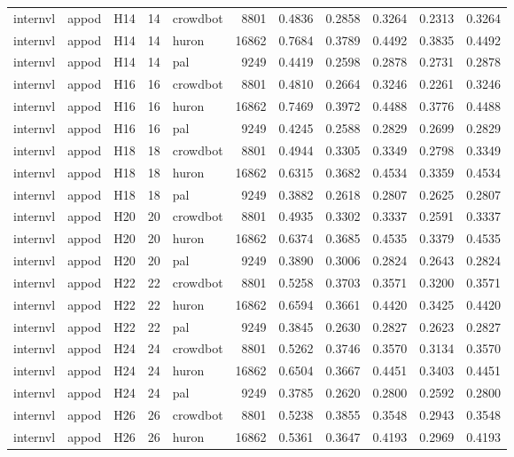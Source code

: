 \begin{table}[tbp]
\begin{tabular}{lllrlrrrrrr}
internvl & appod & H14 & 14 & crowdbot & 8801 & 0.4836 & 0.2858 & 0.3264 & 0.2313 & 0.3264 \\
internvl & appod & H14 & 14 & huron & 16862 & 0.7684 & 0.3789 & 0.4492 & 0.3835 & 0.4492 \\
internvl & appod & H14 & 14 & pal & 9249 & 0.4419 & 0.2598 & 0.2878 & 0.2731 & 0.2878 \\
internvl & appod & H16 & 16 & crowdbot & 8801 & 0.4810 & 0.2664 & 0.3246 & 0.2261 & 0.3246 \\
internvl & appod & H16 & 16 & huron & 16862 & 0.7469 & 0.3972 & 0.4488 & 0.3776 & 0.4488 \\
internvl & appod & H16 & 16 & pal & 9249 & 0.4245 & 0.2588 & 0.2829 & 0.2699 & 0.2829 \\
internvl & appod & H18 & 18 & crowdbot & 8801 & 0.4944 & 0.3305 & 0.3349 & 0.2798 & 0.3349 \\
internvl & appod & H18 & 18 & huron & 16862 & 0.6315 & 0.3682 & 0.4534 & 0.3359 & 0.4534 \\
internvl & appod & H18 & 18 & pal & 9249 & 0.3882 & 0.2618 & 0.2807 & 0.2625 & 0.2807 \\
internvl & appod & H20 & 20 & crowdbot & 8801 & 0.4935 & 0.3302 & 0.3337 & 0.2591 & 0.3337 \\
internvl & appod & H20 & 20 & huron & 16862 & 0.6374 & 0.3685 & 0.4535 & 0.3379 & 0.4535 \\
internvl & appod & H20 & 20 & pal & 9249 & 0.3890 & 0.3006 & 0.2824 & 0.2643 & 0.2824 \\
internvl & appod & H22 & 22 & crowdbot & 8801 & 0.5258 & 0.3703 & 0.3571 & 0.3200 & 0.3571 \\
internvl & appod & H22 & 22 & huron & 16862 & 0.6594 & 0.3661 & 0.4420 & 0.3425 & 0.4420 \\
internvl & appod & H22 & 22 & pal & 9249 & 0.3845 & 0.2630 & 0.2827 & 0.2623 & 0.2827 \\
internvl & appod & H24 & 24 & crowdbot & 8801 & 0.5262 & 0.3746 & 0.3570 & 0.3134 & 0.3570 \\
internvl & appod & H24 & 24 & huron & 16862 & 0.6504 & 0.3667 & 0.4451 & 0.3403 & 0.4451 \\
internvl & appod & H24 & 24 & pal & 9249 & 0.3785 & 0.2620 & 0.2800 & 0.2592 & 0.2800 \\
internvl & appod & H26 & 26 & crowdbot & 8801 & 0.5238 & 0.3855 & 0.3548 & 0.2943 & 0.3548 \\
internvl & appod & H26 & 26 & huron & 16862 & 0.5361 & 0.3647 & 0.4193 & 0.2969 & 0.4193 \\

\end{tabular}
\end{table}
